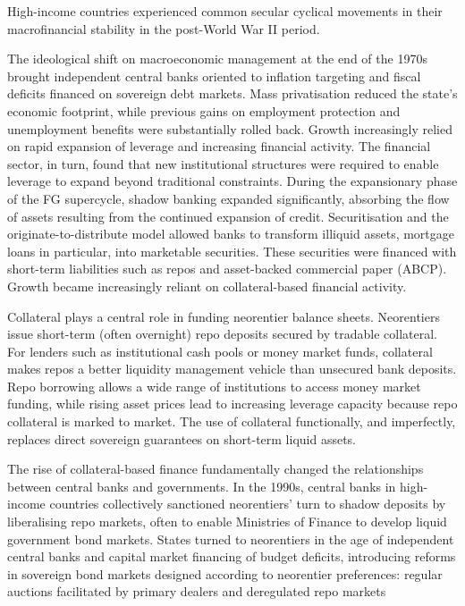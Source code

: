 \documentclass[
]{book}
\begin{document}
High-income countries experienced common secular cyclical movements in their
macrofinancial stability in the post-World War II period.

The ideological shift on macroeconomic management at the end of the 1970s brought independent
central banks oriented to inflation targeting and fiscal deficits financed on sovereign debt markets.
Mass privatisation reduced the state's economic footprint, while previous gains on employment
protection and unemployment benefits were substantially rolled back. Growth
increasingly relied on rapid expansion of leverage and increasing financial activity.
The financial sector, in turn, found that new institutional structures were required
to enable leverage to expand beyond traditional constraints.
During the expansionary phase of the FG supercycle, shadow banking expanded significantly,
absorbing the flow of assets resulting from the continued expansion of credit.
Securitisation and the originate-to-distribute model allowed banks to
transform illiquid assets, mortgage loans in particular, into marketable securities.
These securities were financed with short-term liabilities such as
repos and asset-backed commercial paper (ABCP).
Growth became increasingly reliant on collateral-based financial activity.

Collateral plays a central role in funding neorentier balance sheets.
Neorentiers issue short-term (often overnight) repo deposits secured by tradable collateral.
For lenders such as institutional cash pools or money market funds, collateral
makes repos a better liquidity management vehicle than unsecured bank deposits.
Repo borrowing allows a wide range of institutions to access money market
funding, while rising asset prices lead to increasing leverage capacity
because repo collateral is marked to market.
The use of collateral functionally, and imperfectly, replaces direct
sovereign guarantees on short-term liquid assets.

The rise of collateral-based finance fundamentally changed the relationships
between central banks and governments.
In the 1990s, central banks in high-income countries collectively sanctioned neorentiers'
turn to shadow deposits by liberalising repo markets,
often to enable Ministries of Finance to develop liquid government bond markets.
States turned to neorentiers in the age of
independent central banks and capital market financing of budget deficits, introducing reforms in
sovereign bond markets designed according to neorentier preferences:
regular auctions facilitated by primary dealers and deregulated repo markets
\end{document}
